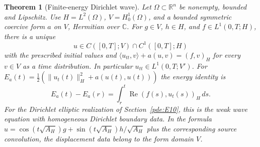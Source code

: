 \documentclass[11pt,oneside,openany]{book}
\theoremstyle{plain}
\newtheorem{theorem}{Theorem}[chapter]
\theoremstyle{definition}
\theoremstyle{remark}
\begin{document}
\begin{theorem}[Finite-energy Dirichlet wave]\label{thm:pde-dirichlet-wave}
Let \(\Omega\subset\mathbb R^n\) be nonempty, bounded and Lipschitz.
Use \(H=L^2(\Omega)\), \(V=H^1_0(\Omega)\), and a bounded symmetric
coercive form \(a\) on \(V\), Hermitian over \(\mathbb C\).
For \(g\in V\), \(h\in H\), and \(f\in L^1(0,T;H)\), there is a
unique
\[
 u\in C([0,T];V)\cap C^1([0,T];H)
\]
with the prescribed initial values and
\(\langle u_{tt},v\rangle+a(u,v)=(f,v)_H\) for every \(v\in V\)
as a time distribution. In particular
\(u_{tt}\in L^1(0,T;V')\).
For \(E_a(t)=\tfrac12(\|u_t(t)\|_H^2+a(u(t),u(t)))\) the energy
identity is
\[
 E_a(t)-E_a(r)
   =\int_r^t\operatorname{Re}(f(s),u_t(s))_H\,ds .
\]
For the Dirichlet elliptic realization of Section~\ref{pde:E10},
this is the weak wave equation with homogeneous Dirichlet boundary
data. In the formula \(u=\cos(t\sqrt{A_H})g+
\sin(t\sqrt{A_H})h/\sqrt{A_H}\) plus the corresponding source
convolution, the displacement data belong to the form domain \(V\).
\end{theorem}
\end{document}
